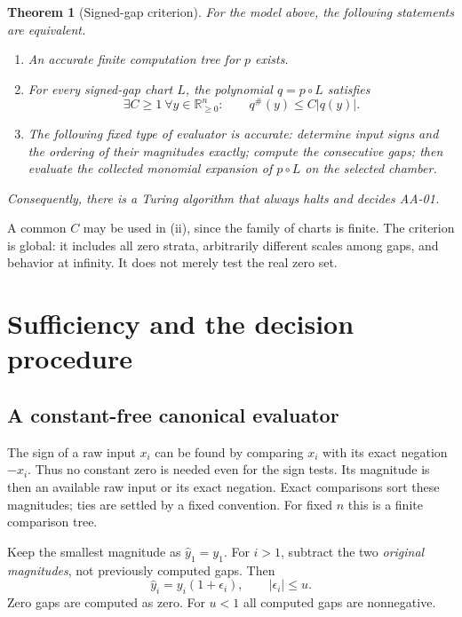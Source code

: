\documentclass[11pt,a4paper]{article}
\newtheorem{theorem}{Theorem}[section]
\theoremstyle{definition}
\theoremstyle{remark}
\newcommand{\R}{\mathbb R}
\newcommand{\abs}[1]{\lvert #1\rvert}
\newcommand{\maj}[1]{#1^{\#}}
\begin{document}
\begin{theorem}[Signed-gap criterion]\label{thm:main}
For the model above, the following statements are equivalent.
\begin{enumerate}[label=\textnormal{(\roman*)}]
\item An accurate finite computation tree for $p$ exists.
\item For every signed-gap chart $L$, the polynomial $q=p\circ L$ satisfies
\begin{equation}\label{eq:criterion}
 \exists C\ge1\ \forall y\in\R_{\ge0}^n:\qquad
 \maj q(y)\le C\abs{q(y)}.
\end{equation}
\item The following fixed type of evaluator is accurate: determine input signs
and the ordering of their magnitudes exactly; compute the consecutive gaps;
then evaluate the collected monomial expansion of $p\circ L$ on the selected
chamber.
\end{enumerate}
Consequently, there is a Turing algorithm that always halts and decides AA-01.
\end{theorem}

A common $C$ may be used in (ii), since the family of charts is finite. The
criterion is global: it includes all zero strata, arbitrarily different scales
among gaps, and behavior at infinity. It does not merely test the real zero set.

\section{Sufficiency and the decision procedure}

\subsection{A constant-free canonical evaluator}

The sign of a raw input $x_i$ can be found by comparing $x_i$ with its exact
negation $-x_i$. Thus no constant zero is needed even for the sign tests.
Its magnitude is then an available raw input or its exact negation. Exact
comparisons sort these magnitudes; ties are settled by a fixed convention.
For fixed $n$ this is a finite comparison tree.

Keep the smallest magnitude as $\widehat y_1=y_1$. For $i>1$, subtract the two
\emph{original magnitudes}, not previously computed gaps. Then
\begin{equation}\label{eq:roundedgaps}
 \widehat y_i=y_i(1+\epsilon_i),\qquad \abs{\epsilon_i}\le u.
\end{equation}
Zero gaps are computed as zero. For $u<1$ all computed gaps are nonnegative.
\end{document}
